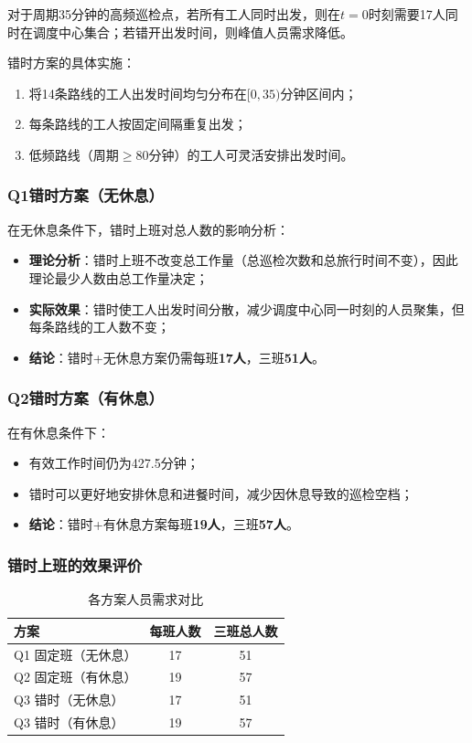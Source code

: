 \documentclass[12pt,a4paper]{article}
\begin{document}
对于周期35分钟的高频巡检点，若所有工人同时出发，则在$t=0$时刻需要17人同时在调度中心集合；若错开出发时间，则峰值人员需求降低。

错时方案的具体实施：
\begin{enumerate}
    \item 将14条路线的工人出发时间均匀分布在$[0, 35)$分钟区间内；
    \item 每条路线的工人按固定间隔重复出发；
    \item 低频路线（周期$\geq$80分钟）的工人可灵活安排出发时间。
\end{enumerate}

\subsubsection{Q1错时方案（无休息）}

在无休息条件下，错时上班对总人数的影响分析：

\begin{itemize}
    \item \textbf{理论分析}：错时上班不改变总工作量（总巡检次数和总旅行时间不变），因此理论最少人数由总工作量决定；
    \item \textbf{实际效果}：错时使工人出发时间分散，减少调度中心同一时刻的人员聚集，但每条路线的工人数不变；
    \item \textbf{结论}：错时+无休息方案仍需每班\textbf{17人}，三班\textbf{51人}。
\end{itemize}

\subsubsection{Q2错时方案（有休息）}

在有休息条件下：

\begin{itemize}
    \item 有效工作时间仍为427.5分钟；
    \ \item 错时可以更好地安排休息和进餐时间，减少因休息导致的巡检空档；
    \item \textbf{结论}：错时+有休息方案每班\textbf{19人}，三班\textbf{57人}。
\end{itemize}

\subsubsection{错时上班的效果评价}

\begin{table}[H]
\centering
\caption{各方案人员需求对比}
\label{tab:comparison}
\begin{tabular}{lcc}
\toprule
\textbf{方案} & \textbf{每班人数} & \textbf{三班总人数} \\
\midrule
Q1 固定班（无休息） & 17 & 51 \\
Q2 固定班（有休息） & 19 & 57 \\
Q3 错时（无休息） & 17 & 51 \\
Q3 错时（有休息） & 19 & 57 \\
\bottomrule
\end{tabular}
\end{table}
\end{document}
